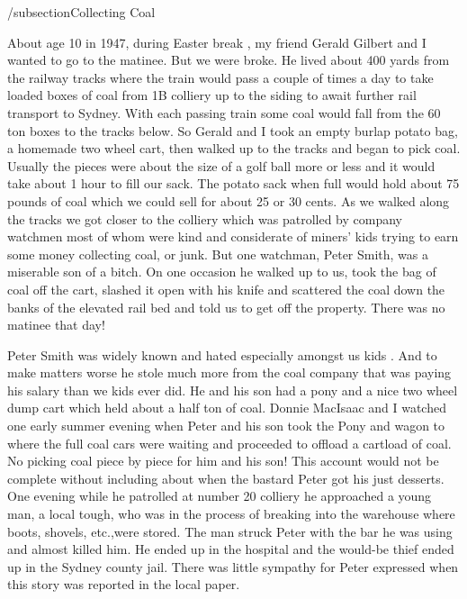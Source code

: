 /subsection{Collecting Coal}

About age 10 in 1947, during Easter break , my friend Gerald Gilbert and I wanted to go to the matinee. But we were broke. He lived about 400 yards from the railway tracks where the train would pass a couple of times a day to take loaded boxes of coal from 1B colliery up to the siding to await further rail transport to Sydney. With each passing train some coal would fall from the 60 ton boxes to the tracks below. So Gerald and I took an empty burlap potato bag, a homemade two wheel cart, then walked up to the tracks and began to pick coal. Usually the pieces were about the size of a golf ball more or less and it would take about 1 hour to fill our sack. The potato sack when full would hold about 75 pounds of coal which we could sell for about 25 or 30 cents. As we walked along the tracks we got closer to the colliery which was patrolled by company watchmen most of whom were kind and considerate of miners' kids trying to earn some money collecting coal, or junk. But one watchman, Peter Smith, was a miserable son of a bitch. On one occasion he walked up to us, took the bag of coal off the cart, slashed it open with his knife and scattered the coal down the banks of the elevated rail bed and told us to get off the property. There was no matinee that day!

Peter Smith was widely known and hated especially amongst us kids . And to make matters worse he stole much more from the coal company that was paying his salary than we kids ever did. He and his son had a pony and a nice two wheel dump cart which held about a half ton of coal. Donnie MacIsaac and I watched one early summer evening when Peter and his son took the Pony and wagon to where the full coal cars were waiting and proceeded to offload a cartload of coal. No picking coal piece by piece for him and his son! This account would not be complete without including about when the bastard Peter got his just desserts. One evening while he patrolled at number 20 colliery he approached a young man, a local tough, who was in the process of breaking into the warehouse where boots, shovels, etc.,were stored. The man struck Peter with the bar he was using and almost killed him. He ended up in the hospital and the would-be thief ended up in the Sydney county jail. There was little sympathy for Peter expressed when this story was reported in the local paper.


